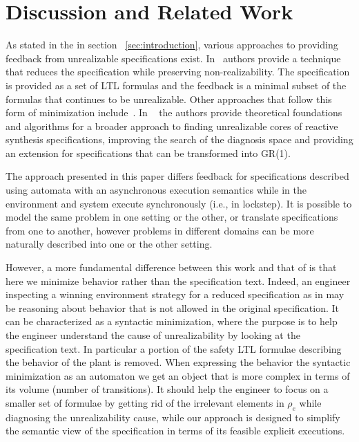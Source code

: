 \section{Discussion and Related Work}\label{sec:discussion}

As stated in the in section ~\ref{sec:introduction}, various approaches to providing feedback from unrealizable specifications exist. In~\cite{DBLP:conf/fmcad/KonighoferHB09} authors provide a technique that reduces the specification while preserving non-realizability. The specification is provided as a set of LTL formulas and the feedback is a minimal subset of the formulas that continues to be unrealizable. Other approaches that follow this form of minimization include~\cite{DBLP:journals/scp/Schuppan12}. In ~\cite{maoz2021unrealizable} the authors provide theoretical foundations and algorithms for a broader approach to finding unrealizable cores of reactive synthesis specifications, improving the search of the diagnosis space and providing an extension for specifications that can be transformed into GR(1).
 
The approach presented in this paper differs feedback for specifications described using automata with an asynchronous execution semantics while in \cite{DBLP:conf/fmcad/KonighoferHB09} the environment and system execute synchronously (i.e., in lockstep). It is possible to model the same problem in one setting or the other, or translate specifications from one to another, however problems in different domains can  be more naturally described into one or the other setting.

However, a more fundamental difference between this work and that of \cite{DBLP:conf/fmcad/KonighoferHB09} is that here we minimize behavior rather than the specification text. Indeed, an engineer inspecting a winning environment strategy for a reduced specification as in \cite{DBLP:conf/fmcad/KonighoferHB09} may be reasoning about behavior that is not allowed in the original specification.  It can be characterized as a syntactic minimization, where the purpose is to help the engineer understand the cause of unrealizability by looking at the specification text. In particular a portion of the safety LTL formulae describing the behavior of the plant is removed. 
When expressing the behavior the syntactic minimization as an automaton we get an object that is more complex in terms of its volume (number of transitions). 
It should help the engineer to focus on a smaller set of formulae by getting rid of the irrelevant elements in $\rho_e$ while diagnosing the unrealizability cause, while
our approach is designed to simplify the semantic view of the specification in terms of its feasible explicit executions.

